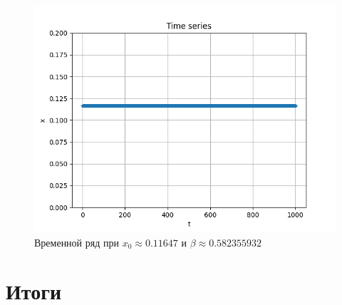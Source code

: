     \begin{figure}[h]
        \includegraphics[scale=0.8]{images/Time_series_x_011647_b_0582355932.png}    
        \caption{Временной ряд при \(x_0 \approx 0.11647\) и \(\beta \approx 0.582355932\)}
    \end{figure}

\section{Итоги}